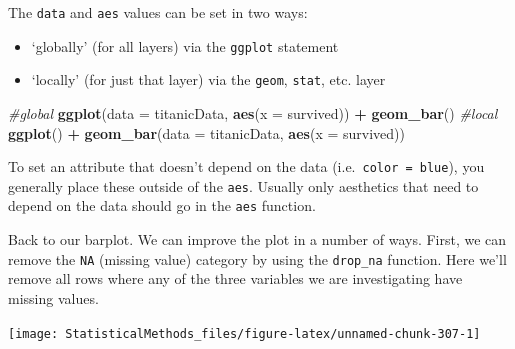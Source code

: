 \documentclass[
]{book}
\newenvironment{Shaded}{\begin{snugshade}}{\end{snugshade}}
\newcommand{\CommentTok}[1]{\textcolor[rgb]{0.56,0.35,0.01}{\textit{#1}}}
\newcommand{\DataTypeTok}[1]{\textcolor[rgb]{0.13,0.29,0.53}{#1}}
\newcommand{\KeywordTok}[1]{\textcolor[rgb]{0.13,0.29,0.53}{\textbf{#1}}}
\newcommand{\NormalTok}[1]{#1}
\newcommand{\OperatorTok}[1]{\textcolor[rgb]{0.81,0.36,0.00}{\textbf{#1}}}
\newcommand{\StringTok}[1]{\textcolor[rgb]{0.31,0.60,0.02}{#1}}
\theoremstyle{definition}
\theoremstyle{definition}
\theoremstyle{definition}
\theoremstyle{remark}
\begin{document}
The \texttt{data} and \texttt{aes} values can be set in two ways:

\begin{itemize}
\item
  `globally' (for all layers) via the \texttt{ggplot} statement
\item
  `locally' (for just that layer) via the \texttt{geom}, \texttt{stat}, etc. layer
\end{itemize}

\begin{Shaded}
\begin{Highlighting}[]
\CommentTok{#global }
\KeywordTok{ggplot}\NormalTok{(}\DataTypeTok{data =}\NormalTok{ titanicData, }\KeywordTok{aes}\NormalTok{(}\DataTypeTok{x =}\NormalTok{ survived)) }\OperatorTok{+}\StringTok{ }\KeywordTok{geom_bar}\NormalTok{()}
\CommentTok{#local }
\KeywordTok{ggplot}\NormalTok{() }\OperatorTok{+}\StringTok{ }\KeywordTok{geom_bar}\NormalTok{(}\DataTypeTok{data =}\NormalTok{ titanicData, }\KeywordTok{aes}\NormalTok{(}\DataTypeTok{x =}\NormalTok{ survived))}
\end{Highlighting}
\end{Shaded}

To set an attribute that doesn't depend on the data (i.e.~\texttt{color\ =\ \textquotesingle{}blue\textquotesingle{}}), you generally place these outside of the \texttt{aes}. Usually only aesthetics that need to depend on the data should go in the \texttt{aes} function.

Back to our barplot. We can improve the plot in a number of ways. First, we can remove the \texttt{NA} (missing value) category by using the \texttt{drop\_na} function. Here we'll remove all rows where any of the three variables we are investigating have missing values.

\begin{Shaded}
\end{Shaded}

\begin{center}\texttt{[image: StatisticalMethods\_files/figure-latex/unnamed-chunk-307-1]} \end{center}
\end{document}
